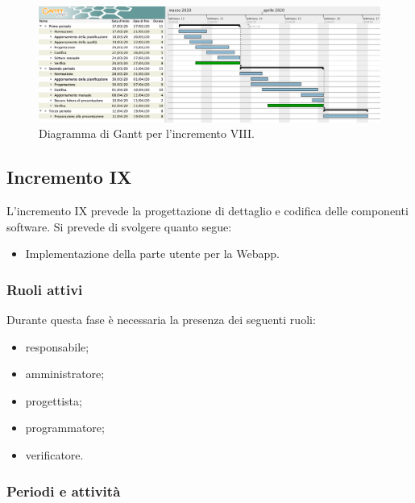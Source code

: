 		\begin{landscape}
          \begin{figure}[H]
            \centering
            \includegraphics[width=\linewidth]{images/ganttDettaglioCodifica} %
            \caption{Diagramma di Gantt per l'incremento VIII.}
          \end{figure}		
		\end{landscape}


		\subsection{Incremento IX}
			
			L'incremento IX prevede la progettazione di dettaglio e codifica delle componenti software. Si prevede di svolgere quanto segue:
			\begin{itemize}
				\item Implementazione della parte utente per la Webapp.
			\end{itemize}
			
			\subsubsection{Ruoli attivi}
			
				Durante questa fase è necessaria la presenza dei seguenti ruoli:
				\begin{itemize}
					\item responsabile;
					\item amministratore;
					\item progettista;
					\item programmatore;
					\item verificatore.
				\end{itemize}
			
			\subsubsection{Periodi e attività}
			
